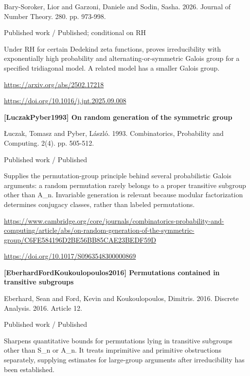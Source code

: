 \documentclass[11pt,a4paper,oneside,openany]{book}
\begin{document}
\color{black} Bary-Soroker, Lior and Garzoni, Daniele and Sodin, Sasha. 2026. Journal of Number Theory. 280. pp. 973-998.\par
{\small\sffamily\color{atlasgold}Published work / Published; conditional on RH}\par
\color{black} Under RH for certain Dedekind zeta functions, proves irreducibility with exponentially high probability and alternating-or-symmetric Galois group for a specified tridiagonal model. A related model has a smaller Galois group.\par
{\footnotesize\url{https://arxiv.org/abs/2502.17218}}\par
{\footnotesize\url{https://doi.org/10.1016/j.jnt.2025.09.008}}\par
\vspace{9pt}
\hypertarget{ref:LuczakPyber1993}{}
{\sffamily\bfseries\color{atlasgreen}[LuczakPyber1993] On random generation of the symmetric group}\par
\color{black} Łuczak, Tomasz and Pyber, László. 1993. Combinatorics, Probability and Computing. 2(4). pp. 505-512.\par
{\small\sffamily\color{atlasgold}Published work / Published}\par
\color{black} Supplies the permutation-group principle behind several probabilistic Galois arguments: a random permutation rarely belongs to a proper transitive subgroup other than A\_\allowbreak{}n. Invariable generation is relevant because modular factorization determines conjugacy classes, rather than labeled permutations.\par
{\footnotesize\url{https://www.cambridge.org/core/journals/combinatorics-probability-and-computing/article/abs/on-random-generation-of-the-symmetric-group/C6FE584196D2BE56BB85CAE23BEDF59D}}\par
{\footnotesize\url{https://doi.org/10.1017/S0963548300000869}}\par
\vspace{9pt}
\hypertarget{ref:EberhardFordKoukoulopoulos2016}{}
{\sffamily\bfseries\color{atlasgreen}[EberhardFordKoukoulopoulos2016] Permutations contained in transitive subgroups}\par
\color{black} Eberhard, Sean and Ford, Kevin and Koukoulopoulos, Dimitris. 2016. Discrete Analysis. 2016. Article 12.\par
{\small\sffamily\color{atlasgold}Published work / Published}\par
\color{black} Sharpens quantitative bounds for permutations lying in transitive subgroups other than S\_\allowbreak{}n or A\_\allowbreak{}n. It treats imprimitive and primitive obstructions separately, supplying estimates for large-group arguments after irreducibility has been established.\par
\end{document}
